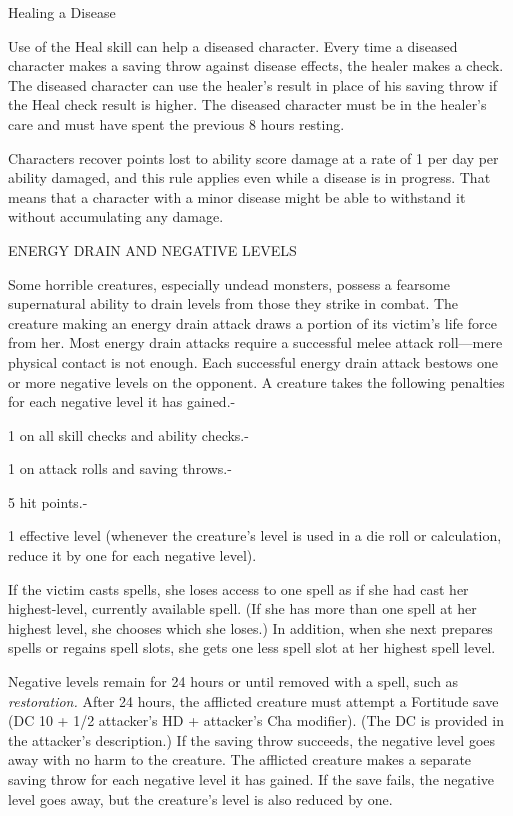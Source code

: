 \documentclass{article}
\begin{document}
Healing a Disease

Use of the Heal skill can help a diseased character. Every time a diseased character 
makes a saving throw against disease effects, the healer makes a check. The diseased 
character can use the healer's result in place of his saving throw if the Heal 
check result is higher. The diseased character must be in the healer's care and 
must have spent the previous 8 hours resting.

Characters recover points lost to ability score damage at a rate of 1 per day per 
ability damaged, and this rule applies even while a disease is in progress. That 
means that a character with a minor disease might be able to withstand it without 
accumulating any damage.

\vspace{12pt}
ENERGY DRAIN AND NEGATIVE LEVELS

Some horrible creatures, especially undead monsters, possess a fearsome supernatural 
ability to drain levels from those they strike in combat. The creature making an 
energy drain attack draws a portion of its victim's life force from her. Most energy 
drain attacks require a successful melee attack roll---mere physical contact is 
not enough. Each successful energy drain attack bestows one or more negative levels 
on the opponent. A creature takes the following penalties for each negative level 
it has gained.-

1 on all skill checks and ability checks.-

1 on attack rolls and saving throws.-

5 hit points.-

1 effective level (whenever the creature's level is used in a die roll or calculation, 
reduce it by one for each negative level). 

If the victim casts spells, she loses access to one spell as if she had cast her 
highest-level, currently available spell. (If she has more than one spell at her 
highest level, she chooses which she loses.) In addition, when she next prepares 
spells or regains spell slots, she gets one less spell slot at her highest spell 
level. 

Negative levels remain for 24 hours or until removed with a spell, such as \textit{restoration. 
}After 24 hours, the afflicted creature must attempt a Fortitude save (DC 10 + 
1/2 attacker's HD + attacker's Cha modifier). (The DC is provided in the attacker's 
description.) If the saving throw succeeds, the negative level goes away with no 
harm to the creature. The afflicted creature makes a separate saving throw for 
each negative level it has gained. If the save fails, the negative level goes away, 
but the creature's level is also reduced by one.
\end{document}
